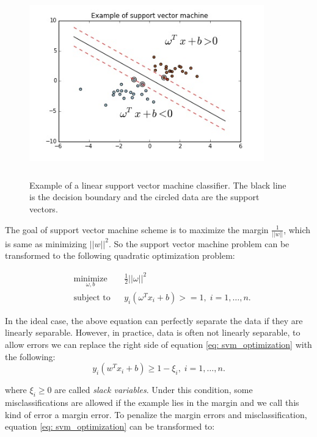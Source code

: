 \begin{figure}[!htb]
	\begin{center}
		\includegraphics[width=4in, height=3.2in]{figures/svm_example.jpg}
	\end{center}
	\caption{Example of a linear support vector machine classifier. The black line is the decision boundary and the circled data are the support vectors.} \label{fig: svm_example}
\end{figure}
The goal of support vector machine scheme is to maximize the margin $\frac{1}{||w||}$,  which is same as minimizing $||w||^2$. So the support vector machine problem can be transformed to the following quadratic optimization problem: 

\begin{equation}\label{eq: svm_optimization}
\begin{aligned}
& \underset{\omega, b}{\text{minimize}}
& &\frac{1}{2}||\omega||^2\\
& \text{subject to}
& & y_i(\omega^Tx_i+b)>=1,  \; i = 1,  \ldots,  n.
\end{aligned}
\end{equation}

In the ideal case,  the above equation can perfectly separate the data if they are linearly separable. However, in practice,  data is often not linearly separable,  to allow errors we can replace the right side of equation \ref{eq: svm_optimization} with the following: 
\begin{equation}
y_i(w^Tx_i+b)\geq1-\xi_i, \; i=1, \dots, n.
\end{equation}

where $\xi_i\geq0$ are called \textit{slack variables}. Under this condition,  some misclassifications are allowed if the example lies in the margin and we call this kind of error a margin error. To penalize the margin errors and misclassification,  equation \ref{eq: svm_optimization} can be transformed to: 
 
